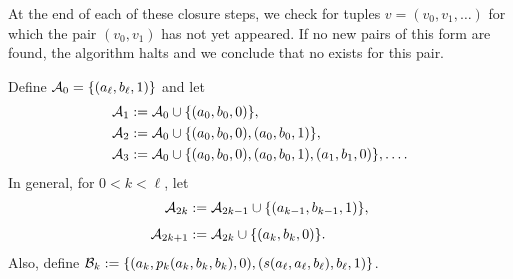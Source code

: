     At the end of each of these closure steps, we check for 
    tuples $v = (v_0, v_1, \dots)$ for which the pair $(v_0, v_1)$ has not
    yet appeared.  If no new pairs of this form are found, the algorithm halts
    and we conclude that no \ldto exists for this pair.
    
  



  
  
  

  







  
  
  
  
  
  
  
  

  












  Define $\mathcal{A}_0 =\{(a_\ell, b_\ell, 1)\}$ and let
  \begin{align*}
    \mathcal{A}_1 &:=\mathcal{A}_0  \cup \{(a_0, b_0, 0) \},\\
    \mathcal{A}_2 &:=\mathcal{A}_0  \cup \{(a_0, b_0, 0), (a_0, b_0, 1)\},\\
    \mathcal{A}_3 &:= \mathcal{A}_0  \cup \{(a_0, b_0, 0), (a_0, b_0, 1), (a_1,b_1,0)\}, \dots.
  \end{align*}
    In general, for $0< k < \ell$, let
  \begin{align*}
    \mathcal{A}_{2k} &:= \mathcal{A}_{2k-1} \cup \{(a_{k-1},b_{k-1},1)\},\\[4pt]
    \mathcal{A}_{2k+1} &:= \mathcal{A}_{2k} \cup \{(a_{k},b_{k},0)\}.
  \end{align*}
  Also, define $\mathcal{B}_k := \{(a_k, p_k(a_k, b_k, b_k), 0), (s(a_{\ell}, a_{\ell}, b_{\ell}), b_{\ell}, 1)\}$.
  
  \medskip
  

